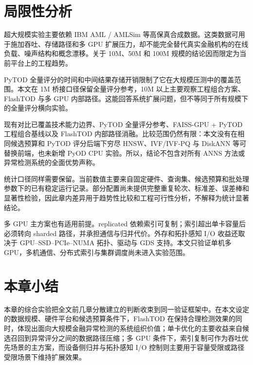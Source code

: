 \section{局限性分析}

超大规模实验主要依赖 IBM AML / AMLSim 等高保真合成数据。这类数据可用于施加吞吐、存储路径和多 GPU 扩展压力，却不能完全替代真实金融机构的在线负载、噪声结构和概念漂移。关于 10M、50M 和 100M 规模的结论因而限定为当前平台上的工程趋势。

PyTOD 全量评分的时间和中间结果存储开销限制了它在大规模压测中的覆盖范围。本文在 1M 桥接口径保留全量评分参考，10M 以上主要观察工程组合方案、FlashTOD 与多 GPU 内部路径。这能回答系统扩展问题，但不等同于所有规模下的全量评分横向实验。

现有对比已覆盖技术能力边界、PyTOD 全量评分参考、FAISS-GPU + PyTOD 工程组合基线以及 FlashTOD 内部路径消融。比较范围仍然有限：本文没有在相同候选预算和 PyTOD 评分后端下穷尽 HNSW、IVF/IVF-PQ 与 DiskANN 等可替换前端，也未新增 PyOD CPU 实验。所以，结论不包含对所有 ANNS 方法或异常检测系统的全面优势声称。

统计口径同样需要保留。当前数值主要来自固定硬件、查询集、候选预算和批处理参数下的已有稳定运行记录。部分配置尚未提供完整重复轮次、标准差、误差棒和显著性检验，因此章内差异用于趋势性比较和工程可行性分析，不解释为统计显著结论。

多 GPU 主方案也有适用前提。replicated 依赖索引可复制；索引超出单卡容量后必须转向 sharded 路径，并承担通信与归并代价。外存和拓扑感知 I/O 收益还取决于 GPU--SSD--PCIe--NUMA 拓扑、驱动与 GDS 支持。本文只验证单机多 GPU，多机通信、分布式索引与集群调度尚未进入实验范围。

\section{本章小结}

本章的综合实验把全文前几章分散建立的判断收束到同一验证框架中。在本文设定的数据规模、硬件平台和候选预算条件下，FlashTOD 在保持合理检测效果的同时，体现出面向大规模金融异常检测的系统组织价值；单卡优化的主要收益来自候选召回到异常评分之间的数据路径压缩；多 GPU 条件下，索引复制可作为吞吐优先场景的主方案，而设备侧归并与拓扑感知 I/O 控制则主要用于容量受限或路径受限场景下维持扩展效果。
